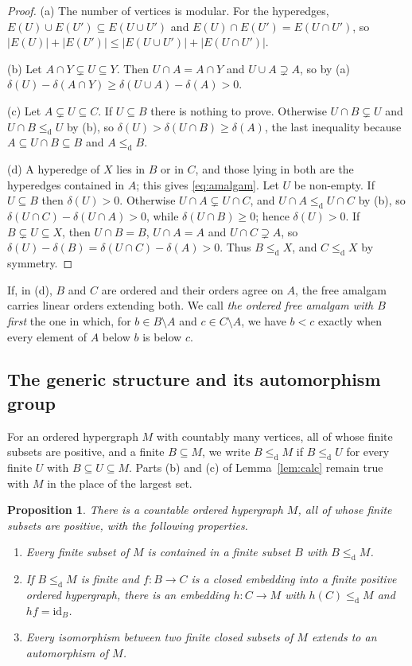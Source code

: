 \documentclass[11pt,a4paper]{article}
\newtheorem{proposition}[theorem]{Proposition}
\theoremstyle{definition}
\newcommand{\cle}{\leq_{\mathrm{d}}}
\newcommand{\id}{\mathrm{id}}
\begin{document}
\begin{proof}
(a) The number of vertices is modular. For the hyperedges,
$E(U)\cup E(U')\subseteq E(U\cup U')$ and $E(U)\cap E(U')=E(U\cap U')$, so
$|E(U)|+|E(U')|\le|E(U\cup U')|+|E(U\cap U')|$.

(b) Let $A\cap Y\subsetneq U\subseteq Y$. Then $U\cap A=A\cap Y$ and
$U\cup A\supsetneq A$, so by (a)
$\delta(U)-\delta(A\cap Y)\ge\delta(U\cup A)-\delta(A)>0$.

(c) Let $A\subsetneq U\subseteq C$. If $U\subseteq B$ there is nothing to prove.
Otherwise $U\cap B\subsetneq U$ and $U\cap B\cle U$ by (b), so
$\delta(U)>\delta(U\cap B)\ge\delta(A)$, the last inequality because
$A\subseteq U\cap B\subseteq B$ and $A\cle B$.

(d) A hyperedge of $X$ lies in $B$ or in $C$, and those lying in both are the
hyperedges contained in $A$; this gives \eqref{eq:amalgam}. Let $U$ be
non-empty. If $U\subseteq B$ then $\delta(U)>0$. Otherwise
$U\cap A\subsetneq U\cap C$, and $U\cap A\cle U\cap C$ by (b), so
$\delta(U\cap C)-\delta(U\cap A)>0$, while $\delta(U\cap B)\ge 0$; hence
$\delta(U)>0$. If $B\subsetneq U\subseteq X$, then $U\cap B=B$, $U\cap A=A$ and
$U\cap C\supsetneq A$, so
$\delta(U)-\delta(B)=\delta(U\cap C)-\delta(A)>0$. Thus $B\cle X$, and
$C\cle X$ by symmetry.
\end{proof}

If, in (d), $B$ and $C$ are ordered and their orders agree on $A$, the free
amalgam carries linear orders extending both. We call \emph{the ordered free
amalgam with $B$ first} the one in which, for $b\in B\setminus A$ and
$c\in C\setminus A$, we have $b<c$ exactly when every element of $A$ below $b$
is below $c$.

\subsection{The generic structure and its automorphism group}

For an ordered hypergraph $M$ with countably many vertices, all of whose finite
subsets are positive, and a finite $B\subseteq M$, we write $B\cle M$ if
$B\cle U$ for every finite $U$ with $B\subseteq U\subseteq M$. Parts (b) and
(c) of Lemma~\ref{lem:calc} remain true with $M$ in the place of the largest
set.

\begin{proposition}\label{prop:generic}
There is a countable ordered hypergraph $M$, all of whose finite subsets are
positive, with the following properties.
\begin{enumerate}
\item[\textup{(M1)}] Every finite subset of $M$ is contained in a finite subset
 $B$ with $B\cle M$.
\item[\textup{(M2)}] If $B\cle M$ is finite and $f\colon B\to C$ is a closed
 embedding into a finite positive ordered hypergraph, there is an embedding
 $h\colon C\to M$ with $h(C)\cle M$ and $hf=\id_B$.
\item[\textup{(M3)}] Every isomorphism between two finite closed subsets of $M$
 extends to an automorphism of $M$.
\end{enumerate}
\end{proposition}
\end{document}
